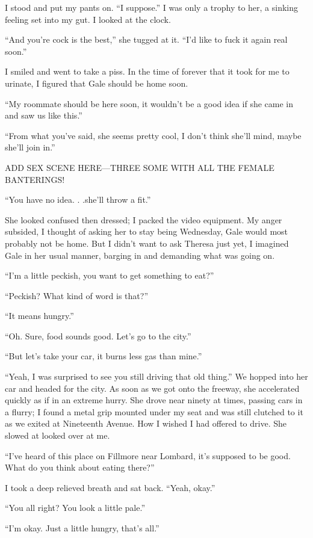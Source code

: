 I stood and put my pants on. ``I suppose.'' I was only a trophy to her,
a sinking feeling set into my gut. I looked at the clock.

``And you're cock is the best,'' she tugged at it. ``I'd like to fuck it
again real soon.''

I smiled and went to take a piss. In the time of forever that it took
for me to urinate, I figured that Gale should be home soon.

``My roommate should be here soon, it wouldn't be a good idea if she
came in and saw us like this.''

``From what you've said, she seems pretty cool, I don't think she'll
mind, maybe she'll join in.''

ADD SEX SCENE HERE---THREE SOME WITH ALL THE FEMALE BANTERINGS!

``You have no idea. . .she'll throw a fit.''

She looked confused then dressed; I packed the video equipment. My anger
subsided, I thought of asking her to stay being Wednesday, Gale would
most probably not be home. But I didn't want to ask Theresa just yet, I
imagined Gale in her usual manner, barging in and demanding what was
going on.

``I'm a little peckish, you want to get something to eat?''

``Peckish? What kind of word is that?''

``It means hungry.''

``Oh. Sure, food sounds good. Let's go to the city.''

``But let's take your car, it burns less gas than mine.''

``Yeah, I was surprised to see you still driving that old thing.'' We
hopped into her car and headed for the city. As soon as we got onto the
freeway, she accelerated quickly as if in an extreme hurry. She drove
near ninety at times, passing cars in a flurry; I found a metal grip
mounted under my seat and was still clutched to it as we exited at
Nineteenth Avenue. How I wished I had offered to drive. She slowed at
looked over at me.

``I've heard of this place on Fillmore near Lombard, it's supposed to be
good. What do you think about eating there?''

I took a deep relieved breath and sat back. ``Yeah, okay.''

``You all right? You look a little pale.''

``I'm okay. Just a little hungry, that's all.''

